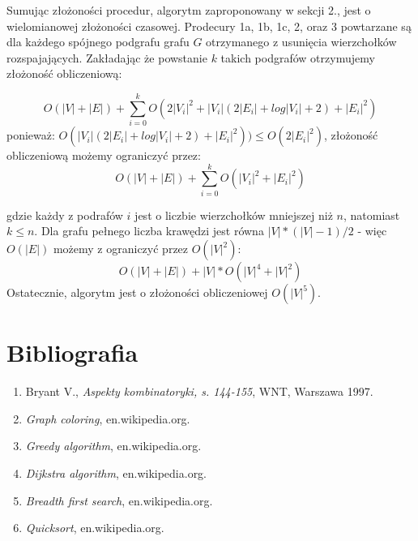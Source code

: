 \documentclass[a4paper]{article}
\begin{document}
	Sumując złożoności procedur, algorytm zaproponowany w sekcji 2., jest o wielomianowej złożoności czasowej. Prodecury 1a, 1b, 1c, 2, oraz 3 powtarzane są dla każdego spójnego podgrafu grafu $G$ otrzymanego z usunięcia wierzchołków rozspajających. Zakładając że powstanie $k$ takich podgrafów otrzymujemy złożoność obliczeniową:

	\begin{equation}
			O(|V| + |E|) + \sum_{i=0}^{k}{O(2|V_i|^2 + |V_i|(2|E_i| + log|V_i| + 2) + |E_i| ^ 2)}
	\end{equation}
	ponieważ: $O(|V_i|(2|E_i| + log|V_i| + 2) + |E_i| ^ 2)) \leq O(2|E_i|^2)$, złożoność obliczeniową możemy ograniczyć przez:
	\begin{equation}
			O(|V| + |E|) + \sum_{i=0}^{k}{O(|V_i|^2 + |E_i|^2)}
	\end{equation}

	gdzie każdy z podrafów $i$ jest o liczbie wierzchołków mniejszej niż $n$, natomiast $k \leq n$. Dla grafu pełnego liczba krawędzi jest równa $|V|*(|V| - 1)/2$ - więc $O(|E|)$ możemy z ograniczyć przez $O(|V|^2)$:
	\begin{equation}
		O(|V| + |E|) + |V|*O(|V|^4 + |V|^2)
	\end{equation}
	Ostatecznie, algorytm jest o złożoności obliczeniowej $O(|V|^5)$.

	\section{Bibliografia}
	\begin{enumerate}
		\item Bryant V., \emph{Aspekty kombinatoryki, s. 144-155}, WNT, Warszawa 1997.
		\item \emph{Graph coloring}, en.wikipedia.org.		
		\item \emph{Greedy algorithm}, en.wikipedia.org.
		\item \emph{Dijkstra algorithm}, en.wikipedia.org.
		\item \emph{Breadth first search}, en.wikipedia.org.
		\item \emph{Quicksort}, en.wikipedia.org.
	\end{enumerate}
	
\end{document}
